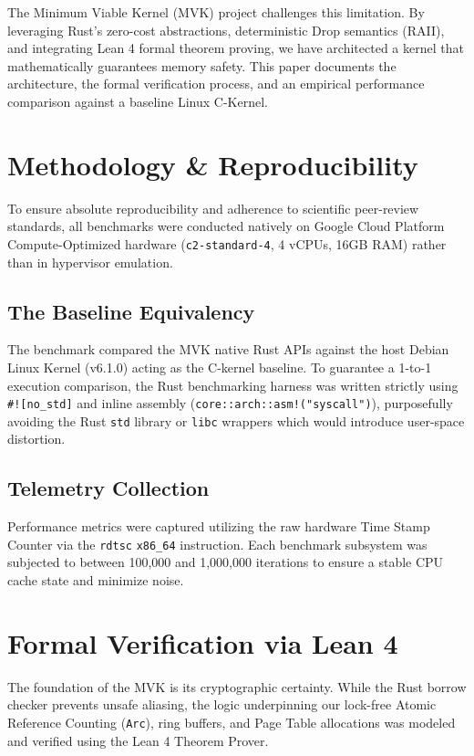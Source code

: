 \documentclass[sigconf]{acmart}
\begin{document}
The Minimum Viable Kernel (MVK) project challenges this limitation. By leveraging Rust's zero-cost abstractions, deterministic Drop semantics (RAII), and integrating Lean 4 formal theorem proving, we have architected a kernel that mathematically guarantees memory safety. This paper documents the architecture, the formal verification process, and an empirical performance comparison against a baseline Linux C-Kernel.

\section{Methodology \& Reproducibility}
To ensure absolute reproducibility and adherence to scientific peer-review standards, all benchmarks were conducted natively on Google Cloud Platform Compute-Optimized hardware (\texttt{c2-standard-4}, 4 vCPUs, 16GB RAM) rather than in hypervisor emulation.

\subsection{The Baseline Equivalency}
The benchmark compared the MVK native Rust APIs against the host Debian Linux Kernel (v6.1.0) acting as the C-kernel baseline. To guarantee a 1-to-1 execution comparison, the Rust benchmarking harness was written strictly using \texttt{\#![no\_std]} and inline assembly (\texttt{core::arch::asm!("syscall")}), purposefully avoiding the Rust \texttt{std} library or \texttt{libc} wrappers which would introduce user-space distortion.

\subsection{Telemetry Collection}
Performance metrics were captured utilizing the raw hardware Time Stamp Counter via the \texttt{rdtsc} \texttt{x86\_64} instruction. Each benchmark subsystem was subjected to between 100,000 and 1,000,000 iterations to ensure a stable CPU cache state and minimize noise.

\section{Formal Verification via Lean 4}
The foundation of the MVK is its cryptographic certainty. While the Rust borrow checker prevents unsafe aliasing, the logic underpinning our lock-free Atomic Reference Counting (\texttt{Arc}), ring buffers, and Page Table allocations was modeled and verified using the Lean 4 Theorem Prover.
\end{document}
